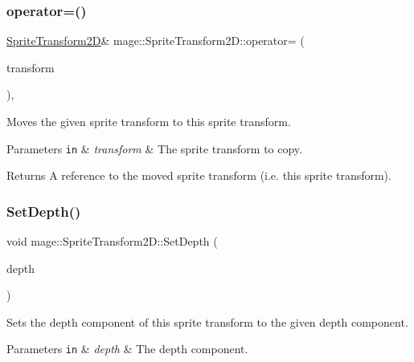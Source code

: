 \subsubsection{\texorpdfstring{operator=()}{operator=()}\hspace{0.1cm}{\footnotesize\ttfamily [2/2]}}
{\footnotesize\ttfamily \mbox{\hyperlink{classmage_1_1_sprite_transform2_d}{Sprite\+Transform2D}}\& mage\+::\+Sprite\+Transform2\+D\+::operator= (\begin{DoxyParamCaption}\item[{\mbox{\hyperlink{classmage_1_1_sprite_transform2_d}{Sprite\+Transform2D}} \&\&}]{transform }\end{DoxyParamCaption})\hspace{0.3cm}{\ttfamily [default]}, {\ttfamily [noexcept]}}

Moves the given sprite transform to this sprite transform.


\begin{DoxyParams}[1]{Parameters}
\mbox{\tt in}  & {\em transform} & The sprite transform to copy. \\
\hline
\end{DoxyParams}
\begin{DoxyReturn}{Returns}
A reference to the moved sprite transform (i.\+e. this sprite transform). 
\end{DoxyReturn}
\mbox{\label{classmage_1_1_sprite_transform2_d_ae2a32bea37357f2739d91efca05faaa0}} 
\subsubsection{\texorpdfstring{Set\+Depth()}{SetDepth()}}
{\footnotesize\ttfamily void mage\+::\+Sprite\+Transform2\+D\+::\+Set\+Depth (\begin{DoxyParamCaption}\item[{\mbox{\hyperlink{namespacemage_aa97e833b45f06d60a0a9c4fc22ae02c0}{F32}}}]{depth }\end{DoxyParamCaption})\hspace{0.3cm}{\ttfamily [noexcept]}}

Sets the depth component of this sprite transform to the given depth component.


\begin{DoxyParams}[1]{Parameters}
\mbox{\tt in}  & {\em depth} & The depth component. \\
\hline
\end{DoxyParams}
\mbox{\label{classmage_1_1_sprite_transform2_d_ac1891a7e79561143e1b2bf1b25e93b40}} 

